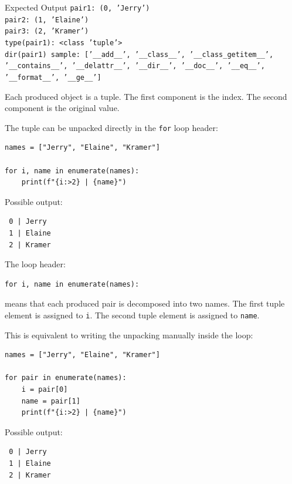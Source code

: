 \documentclass[a4paper,twoside]{report}
\begin{document}
\begin{iobox}{Expected Output}
\texttt{pair1: (0, 'Jerry')} \\
\texttt{pair2: (1, 'Elaine')} \\
\texttt{pair3: (2, 'Kramer')} \\
\texttt{type(pair1): <class 'tuple'>} \\
\texttt{dir(pair1) sample: ['\_\_add\_\_', '\_\_class\_\_', '\_\_class\_getitem\_\_',} \\
\texttt{'\_\_contains\_\_', '\_\_delattr\_\_', '\_\_dir\_\_', '\_\_doc\_\_', '\_\_eq\_\_',} \\
\texttt{'\_\_format\_\_', '\_\_ge\_\_']} \\
\end{iobox}


Each produced object is a tuple. The first component is the index. The second component is the original value.

The tuple can be unpacked directly in the \texttt{for} loop header:

\begin{verbatim}
names = ["Jerry", "Elaine", "Kramer"]

for i, name in enumerate(names):
    print(f"{i:>2} | {name}")
\end{verbatim}

Possible output:

\begin{verbatim}
 0 | Jerry
 1 | Elaine
 2 | Kramer
\end{verbatim}

The loop header:

\begin{verbatim}
for i, name in enumerate(names):
\end{verbatim}

means that each produced pair is decomposed into two names. The first tuple element is assigned to \texttt{i}. The second tuple element is assigned to \texttt{name}.

This is equivalent to writing the unpacking manually inside the loop:

\begin{verbatim}
names = ["Jerry", "Elaine", "Kramer"]

for pair in enumerate(names):
    i = pair[0]
    name = pair[1]
    print(f"{i:>2} | {name}")
\end{verbatim}

Possible output:

\begin{verbatim}
 0 | Jerry
 1 | Elaine
 2 | Kramer
\end{verbatim}
\end{document}
